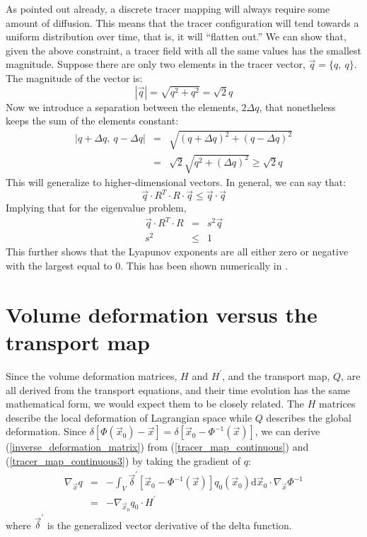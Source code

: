 \documentclass[11pt]{article}
\begin{document}
As pointed out already, a discrete tracer mapping will always require some 
amount of diffusion.  This means that the tracer configuration will 
tend towards a uniform distribution over time, 
that is, it will ``flatten out.''  We can
show that, given the above constraint, a tracer field with all the same values
 has the smallest magnitude.  Suppose there are only two elements in the 
tracer vector, $\vec q=\lbrace q,~q \rbrace$.  The magnitude of the vector is:
\begin{equation}
|\vec q|=\sqrt{q^2+q^2}=\sqrt{2} q
\end{equation}
Now we introduce a separation between the elements, $2\Delta q$, that 
nonetheless keeps the sum of the elements constant:
\begin{eqnarray}
|q+\Delta q,~q-\Delta q| & = & \sqrt{(q+\Delta q)^2+(q-\Delta q)^2} \\
& = & \sqrt{2}\sqrt{q^2+(\Delta q)^2} \ge \sqrt{2} q
\end{eqnarray}
This will generalize to higher-dimensional vectors.  In general, we can
say that:
\begin{equation}
\vec q \cdot R^T \cdot R \cdot \vec q \le \vec q \cdot \vec q
\label{tracer_map_inequality}
\end{equation}
Implying that for the eigenvalue problem,
\begin{eqnarray}
\vec q \cdot R^T \cdot R & = & s^2 \vec q \nonumber\\
s^2 & \le & 1 \label{SV_inequality}
\end{eqnarray}
This further shows that the Lyapunov exponents are all
either zero or negative with the largest equal to 0.  This has been shown
numerically in \citet{Mills2012}.

\section{Volume deformation versus the transport map}

Since the volume deformation matrices,
$H$ and $H^\prime$, and the transport map, $Q$, are all derived from the
transport equations, and their time evolution has the same mathematical form,
we would expect them to be closely related. 
The $H$ matrices describe the local deformation of Lagrangian space 
while $Q$ describes the global deformation.
Since $\delta \left [\Phi(\vec x_0) - \vec x \right ]=\delta \left [\vec x_0 - \Phi^{-1}(\vec x) \right ]$,
we can derive (\ref{inverse_deformation_matrix}) from
(\ref{tracer_map_continuous}) and (\ref{tracer_map_continuous3}) by taking 
the gradient of $q$:
\begin{eqnarray}
	\nabla_{\vec x} q & = & - \int_V \vec \delta^\prime \left [\vec x_0 - \Phi^{-1}(\vec x) \right ] q_0 (\vec x_0) 
	\mathrm d \vec x_0 \cdot \nabla_{\vec x} \Phi^{-1} \\
	& = & - \nabla_{\vec x_0} q_0 \cdot H^\prime
\end{eqnarray}
where $\vec \delta^\prime$ is the generalized vector derivative of the 
delta function.
\end{document}
